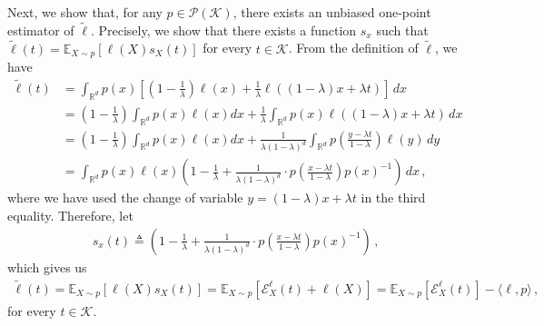 \documentclass{article}
\theoremstyle{plain}
\theoremstyle{definition}
\theoremstyle{plain}
\newcommand{\Rd}{\mathbb{R}^d}
\newcommand{\E}{\mathbb E}
\newcommand{\K}{\mathcal K}
\newcommand{\cE}{\mathcal E}
\newcommand{\cP}{\mathcal P}
\begin{document}
Next, we show that, for any $p \in \cP(\K)$, there exists an unbiased one-point estimator of $\tilde{\ell}$.
Precisely, we show that there exists a function $s_x$ such that $\tilde{\ell}(t) = \E_{X\sim p}[\ell(X) s_X(t)]$ for every $t\in\K$.
From the definition of $\tilde{\ell}$, we have
\begin{align}
    \tilde{\ell}(t)
     & = \int_{\Rd}
    p(x) \left[
        \left(1 - \frac{1}{\lambda}\right) \ell(x)
        + \frac{1}{\lambda} \ell\left(
        (1-\lambda) x + \lambda t
        \right)
    \right]\,dx     \\
     & =
    \left(1 - \frac{1}{\lambda}\right)
    \int_{\Rd}
    p(x)
    \ell(x)
    dx
    +
    \frac{1}{\lambda}
    \int_{\Rd}
    p(x)
    \ell\left(
    (1-\lambda) x + \lambda t
    \right) \,dx    \\
     & =
    \left(1 - \frac{1}{\lambda}\right)
    \int_{\Rd}
    p(x)
    \ell(x)
    dx
    +
    \frac{1}{\lambda (1-\lambda)^d}
    \int_{\Rd}
    p\left(
    \frac{y - \lambda t}{1 - \lambda}
    \right)
    \ell(y) \,dy    \\
     & =
    \int_{\Rd}
    p(x)
    \ell(x)
    \left(
    1 - \frac{1}{\lambda}
    +
    \frac{1}{\lambda (1-\lambda)^d}
    \cdot
    p\left(
    \frac{x - \lambda t}{1 - \lambda}
    \right)
    p(x)^{-1}
    \right) \,dx\,,
\end{align}
where we have used the change of variable $y = (1-\lambda)x + \lambda t$ in the third equality.
Therefore, let
\begin{align}
    s_x(t) \triangleq \left(1 - \frac{1}{\lambda} + \frac{1}{\lambda (1-\lambda)^d} \cdot p\left(\frac{x - \lambda t}{1 - \lambda}\right) p(x)^{-1}\right)\,,
\end{align}
which gives us
\begin{align}
    \tilde{\ell}(t) =  \E_{X\sim p}[\ell(X) s_X(t)]
    = \E_{X\sim p}[\cE_X^\ell(t) + \ell(X)]
    = \E_{X\sim p}[\cE_X^\ell(t)] - \langle \ell, p \rangle
    \,,
\end{align}
for every $t\in\K$.
\end{document}
